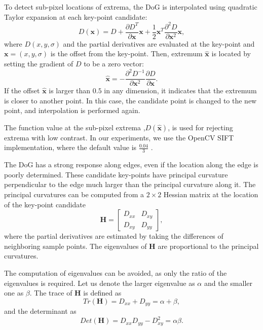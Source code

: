 To detect sub-pixel locations of extrema, the DoG is interpolated using quadratic Taylor expansion at each key-point candidate:
\begin{equation}
    D(\boldsymbol{x}) = D + \frac{\partial D^T}{\partial \boldsymbol{x}}\boldsymbol{x}+\frac{1}{2}\boldsymbol{x}^T\frac{\partial^2 D}{\partial \boldsymbol{x}^2}\boldsymbol{x},
    \label{eq:taylor_expansion}
\end{equation}
where \( D(x,y,\sigma) \) and the partial derivatives are evaluated at the key-point and \( \boldsymbol{x}=(x,y,\sigma) \) is the offset from the key-point. Then, extremum \( \hat{\boldsymbol{x}} \) is located by setting the gradient of \( D \) to be a zero vector:
\begin{equation}
    \hat{\boldsymbol{x}} = - \frac{\partial^2 D^{-1}}{\partial \boldsymbol{x}^2}\frac{\partial D}{\partial \boldsymbol{x}}.
    \label{eq:taylor_extremum}
\end{equation}
If the offset \( \hat{\boldsymbol{x}} \) is larger than \( 0.5 \) in any dimension, it indicates that the extremum is closer to another point. In this case, the candidate point is changed to the new point, and interpolation is performed again.

The function value at the sub-pixel extrema ,$D(\hat{\boldsymbol{x}})$, is used for rejecting extrema with low contrast. In our experiments, we use the OpenCV SIFT implementation, where the default value is $\frac{0.04}{3}$ \cite{openCV}.

The DoG has a strong response along edges, even if the location along the edge is poorly determined. These candidate key-points have principal curvature perpendicular to the edge much larger than the principal curvature along it. The principal curvatures can be computed from a $2\times2$ Hessian matrix at the location of the key-point candidate
\begin{equation}
    \boldsymbol{H} =
    \begin{bmatrix}
        D_{xx} & D_{xy}\\
        D_{xy} & D_{yy}
    \end{bmatrix},
    \label{eq:hessian}
\end{equation}
where the partial derivatives are estimated by taking the differences of neighboring sample points. The eigenvalues of $\boldsymbol{H}$ are proportional to the principal curvatures.

The computation of eigenvalues can be avoided, as only the ratio of the eigenvalues is required. Let us denote the larger eigenvalue as $\alpha$ and the smaller one as $\beta$. The trace of $\boldsymbol{H}$ is defined as
\begin{equation}
    Tr(\boldsymbol{H}) = D_{xx}+D_{yy} = \alpha+\beta,
\end{equation}
and the determinant as
\begin{equation}
    Det(\boldsymbol{H}) = D_{xx}D_{yy}-D_{xy}^2 = \alpha\beta.
\end{equation}

